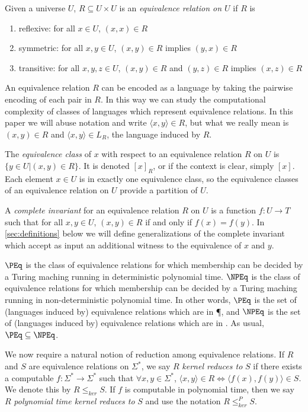 \documentclass[draft]{article}
\theoremstyle{definition} \newtheorem{openproblem}[openproblem]{Open problem}
\theoremstyle{definition} \newtheorem{definition}[definition]{Definition}
\newcommand{\kr}{\leq^{P}_{ker}} %
\newcommand{\krnt}{\leq_{ker}} %
\newcommand{\defn}[1]{\emph{#1}} %
\newcommand{\pair}[2]{\langle#1,#2\rangle} %
\begin{document}
Given a universe $U$, $R\subseteq U\times U$ is an \defn{equivalence relation on $U$} if $R$ is
\begin{enumerate}
\item reflexive: for all $x\in U$, $(x,x)\in R$
\item symmetric: for all $x,y\in U$, $(x,y)\in R$ implies $(y,x)\in R$
\item transitive: for all $x,y,z\in U$, $(x,y)\in R$ and $(y,z)\in R$ implies $(x,z)\in R$
\end{enumerate}
An equivalence relation $R$ can be encoded as a language by taking the pairwise encoding of each pair in $R$.
In this way we can study the computational complexity of classes of languages which represent equivalence relations.
In this paper we will abuse notation and write $\pair{x}{y}\in R$, but what we really mean is $(x,y)\in R$ and $\pair{x}{y}\in L_R$, the language induced by $R$.

The \defn{equivalence class} of $x$ with respect to an equivalence relation $R$ on $U$ is $\{y\in U|(x,y)\in R\}$. It is denoted $[x]_R$, or if the context is clear, simply $[x]$.
Each element $x\in U$ is in exactly one equivalence class, so the equivalence classes of an equivalence relation on $U$ provide a partition of $U$.

A \defn{complete invariant} for an equivalence relation $R$ on $U$ is a function $f\colon U\to T$ such that for all $x,y\in U$, $(x,y)\in R$ if and only if $f(x)=f(y)$.
In \autoref{sec:definitions} below we will define generalizations of the complete invariant which accept as input an additional witness to the equivalence of $x$ and $y$.

\defn{$\PEq$} is the class of equivalence relations for which membership can be decided by a Turing maching running in deterministic polynomial time.
\defn{$\NPEq$} is the class of equivalence relations for which membership can be decided by a Turing maching running in non-deterministic polynomial time.
In other words, $\PEq$ is the set of (languages induced by) equivalence relations which are in \P, and $\NPEq$ is the set of (languages induced by) equivalence relations which are in \NP.
As usual, $\PEq\subseteq\NPEq$.

We now require a natural notion of reduction among equivalence relations.
If $R$ and $S$ are equivalence relations on $\Sigma^*$, we say $R$ \defn{kernel reduces to} $S$ if there exists a computable $f\colon\Sigma^*\to\Sigma^*$ such that $\forall x,y\in\Sigma^*$, $\pair{x}{y}\in R\iff \pair{f(x)}{f(y)}\in S$.
We denote this by $R\krnt S$.
If $f$ is computable in polynomial time, then we say $R$ \defn{polynomial time kernel reduces to} $S$ and use the notation $R\kr S$.
\end{document}
